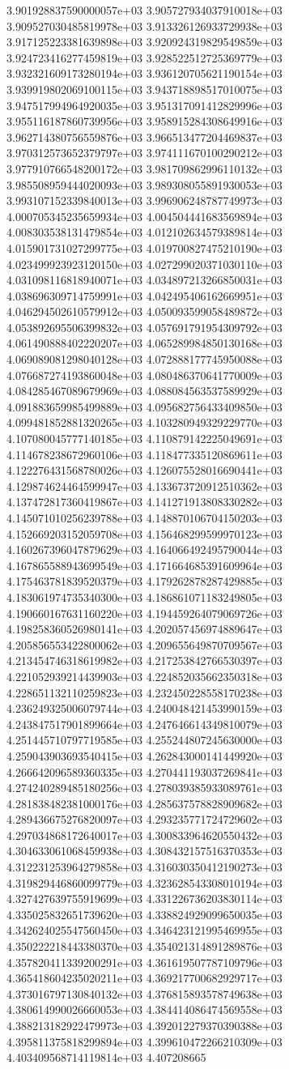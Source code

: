 3.901928837590000057e+03	3.905727934037910018e+03	3.909527030485819978e+03	3.913326126933729938e+03	3.917125223381639898e+03	3.920924319829549859e+03	3.924723416277459819e+03	3.928522512725369779e+03	3.932321609173280194e+03	3.936120705621190154e+03	3.939919802069100115e+03	3.943718898517010075e+03	3.947517994964920035e+03	3.951317091412829996e+03	3.955116187860739956e+03	3.958915284308649916e+03	3.962714380756559876e+03	3.966513477204469837e+03	3.970312573652379797e+03	3.974111670100290212e+03	3.977910766548200172e+03	3.981709862996110132e+03	3.985508959444020093e+03	3.989308055891930053e+03	3.993107152339840013e+03	3.996906248787749973e+03	4.000705345235659934e+03	4.004504441683569894e+03	4.008303538131479854e+03	4.012102634579389814e+03	4.015901731027299775e+03	4.019700827475210190e+03	4.023499923923120150e+03	4.027299020371030110e+03	4.031098116818940071e+03	4.034897213266850031e+03	4.038696309714759991e+03	4.042495406162669951e+03	4.046294502610579912e+03	4.050093599058489872e+03	4.053892695506399832e+03	4.057691791954309792e+03	4.061490888402220207e+03	4.065289984850130168e+03	4.069089081298040128e+03	4.072888177745950088e+03	4.076687274193860048e+03	4.080486370641770009e+03	4.084285467089679969e+03	4.088084563537589929e+03	4.091883659985499889e+03	4.095682756433409850e+03	4.099481852881320265e+03	4.103280949329229770e+03	4.107080045777140185e+03	4.110879142225049691e+03	4.114678238672960106e+03	4.118477335120869611e+03	4.122276431568780026e+03	4.126075528016690441e+03	4.129874624464599947e+03	4.133673720912510362e+03	4.137472817360419867e+03	4.141271913808330282e+03	4.145071010256239788e+03	4.148870106704150203e+03	4.152669203152059708e+03	4.156468299599970123e+03	4.160267396047879629e+03	4.164066492495790044e+03	4.167865588943699549e+03	4.171664685391609964e+03	4.175463781839520379e+03	4.179262878287429885e+03	4.183061974735340300e+03	4.186861071183249805e+03	4.190660167631160220e+03	4.194459264079069726e+03	4.198258360526980141e+03	4.202057456974889647e+03	4.205856553422800062e+03	4.209655649870709567e+03	4.213454746318619982e+03	4.217253842766530397e+03	4.221052939214439903e+03	4.224852035662350318e+03	4.228651132110259823e+03	4.232450228558170238e+03	4.236249325006079744e+03	4.240048421453990159e+03	4.243847517901899664e+03	4.247646614349810079e+03	4.251445710797719585e+03	4.255244807245630000e+03	4.259043903693540415e+03	4.262843000141449920e+03	4.266642096589360335e+03	4.270441193037269841e+03	4.274240289485180256e+03	4.278039385933089761e+03	4.281838482381000176e+03	4.285637578828909682e+03	4.289436675276820097e+03	4.293235771724729602e+03	4.297034868172640017e+03	4.300833964620550432e+03	4.304633061068459938e+03	4.308432157516370353e+03	4.312231253964279858e+03	4.316030350412190273e+03	4.319829446860099779e+03	4.323628543308010194e+03	4.327427639755919699e+03	4.331226736203830114e+03	4.335025832651739620e+03	4.338824929099650035e+03	4.342624025547560450e+03	4.346423121995469955e+03	4.350222218443380370e+03	4.354021314891289876e+03	4.357820411339200291e+03	4.361619507787109796e+03	4.365418604235020211e+03	4.369217700682929717e+03	4.373016797130840132e+03	4.376815893578749638e+03	4.380614990026660053e+03	4.384414086474569558e+03	4.388213182922479973e+03	4.392012279370390388e+03	4.395811375818299894e+03	4.399610472266210309e+03	4.403409568714119814e+03	4.407208665